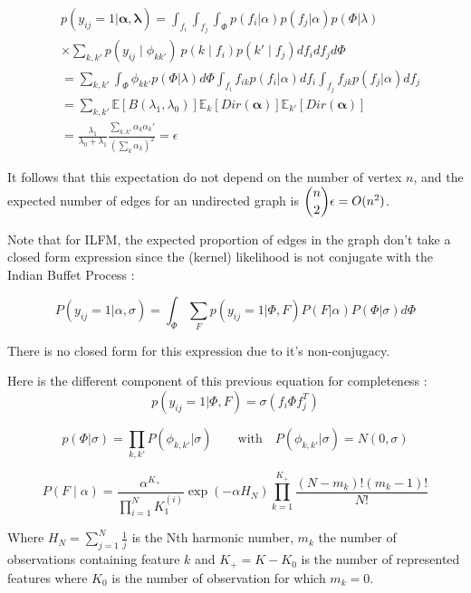 \documentclass{llncs}
\newcommand{\E}{\mathbb{E}}
\newcommand{\mat}[1]{\mathbf{#1}}
\begin{document}
\begin{align*}
&p(y_{ij}=1| \bm{\alpha}, \bm{\lambda}) = \int_{f_i} \int_{f_j} \int_{\Phi} p(f_i| \alpha ) p(f_j| \alpha)p(\Phi| \lambda) \\
&\times \sum_{k,k'} p(y_{ij} \mid \phi_{kk'})\ p(k\mid f_i)p(k'\mid f_j)df_i df_j d\Phi \\
&=  \sum_{k,k'} \int_{\Phi} \phi_{kk'} p(\Phi| \lambda) d\Phi \int_{f_i} f_{ik} p(f_i| \alpha )df_i \int_{f_j} f_{jk}  p(f_j| \alpha ) df_j \\
&= \sum_{k,k'} \E[B(\lambda_1, \lambda_0)] \E_k[Dir(\mat{\alpha} )] \E_{k'}[Dir(\mat{\alpha})] \\
&= \frac{\lambda_1}{\lambda_0+\lambda_1}\frac{\sum_{k,k'} \alpha_k\alpha_k'}{(\sum_k \alpha_k)^2} = \epsilon
\end{align*}

It follows that this expectation do not depend on the number of vertex $n$, and the expected number of edges for an undirected graph is $\dbinom{n}{2} \epsilon = O(n^2)$.

Note that for ILFM, the expected proportion of edges in the graph don't take a closed form expression since the (kernel) likelihood is not conjugate with the Indian Buffet Process :

\begin{equation}
P(y_{ij}=1 | \alpha, \sigma) = \int_\Phi \sum_F p(y_{ij}=1 | \Phi, F)P(F | \alpha) P(\Phi|\sigma) d\Phi
\end{equation}

There is no closed form for this expression due to it's non-conjugacy.

Here is the different component of this previous equation for completeness \cite{griffiths2011indian} :
\begin{equation}
p(y_{ij}=1 | \Phi, F) = \sigma(f_i\Phi f_j^T)
\end{equation}

\begin{equation}
p(\Phi|\sigma) = \prod_{k, k'} P(\phi_{k,k'}|\sigma) \qquad \mathrm{with} \quad P(\phi_{k,k'}|\sigma) = N(0, \sigma)
\end{equation}

\begin{equation}
P(F \mid \alpha) = \frac{\alpha^{K_+}}{\prod_{i=1}^N K_1^{(i)} } \exp(-\alpha H_N) \prod_{k=1}^{K_+} \frac{(N - m_k)!(m_k - 1)!}{N!}
\end{equation}

Where $H_N = \sum_{j=1}^N \frac{1}{j}$ is the Nth harmonic number, $m_k$ the number of observations containing feature $k$ and $K_+=K-K_0$ is the number of represented features where $K_0$ is the number of observation for which $m_k=0$.
\end{document}
